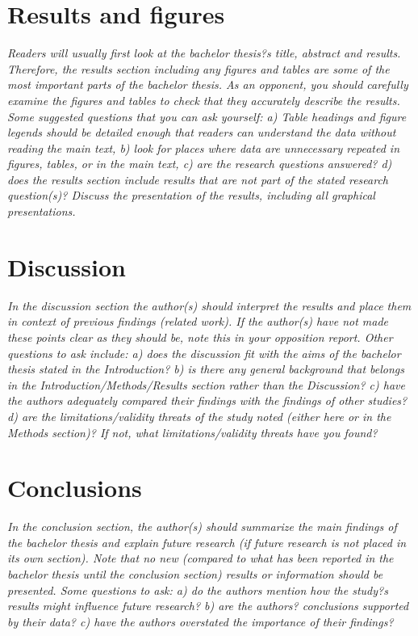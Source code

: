 \documentclass[conference]{IEEEtran}
\begin{document}
\section{Results and figures}
\textit{Readers will usually first look at the bachelor thesis?s title, abstract and results. Therefore, the results section including any figures and tables are some of the most important parts of the bachelor thesis. As an opponent, you should carefully examine the figures and tables to check that they accurately describe the results. Some suggested questions that you can ask yourself: a) Table headings and figure legends should be detailed enough that readers can understand the data without reading the main text, b) look for places where data are unnecessary repeated in figures, tables, or in the main text, c) are the research questions answered? d) does the results section include results that are not part of the stated research question(s)? Discuss the presentation of the results, including all graphical presentations.}

\section{Discussion}
\textit{In the discussion section the author(s) should interpret the results and place them in context of previous findings (related work). If the author(s) have not made these points clear as they should be, note this in your opposition report. Other questions to ask include: a) does the discussion fit with the aims of the bachelor thesis stated in the Introduction? b) is there any general background that belongs in the Introduction/Methods/Results section rather than the Discussion? c) have the authors adequately compared their findings with the findings of other studies? d) are the limitations/validity threats of the study noted (either here or in the Methods section)? If not, what limitations/validity threats have you found?}

\section{Conclusions}
\textit{In the conclusion section, the author(s) should summarize the main findings of the bachelor thesis and explain future research (if future research is not placed in its own section). Note that no new (compared to what has been reported in the bachelor thesis until the conclusion section) results or information should be presented. Some questions to ask: a) do the authors mention how the study?s results might influence future research? b) are the authors? conclusions supported by their data? c) have the authors overstated the importance of their findings?}
\end{document}
